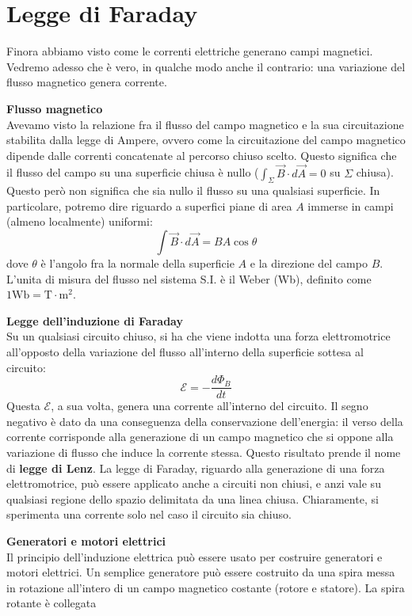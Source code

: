 \documentclass[a4paper,12pt]{article}
\begin{document}
\section{Legge di Faraday}
Finora abbiamo visto come le correnti elettriche generano campi magnetici. Vedremo adesso che è vero, in qualche
modo anche il contrario: una variazione del flusso magnetico genera corrente.
\par\smallskip
\textbf{Flusso magnetico} \\
Avevamo visto la relazione fra il flusso del campo magnetico e la sua circuitazione stabilita dalla legge di Ampere, ovvero
come la circuitazione del campo magnetico dipende dalle correnti concatenate al percorso chiuso scelto. Questo significa
che il flusso del campo su una superficie chiusa è nullo ($\int_\Sigma \vec{B} \cdot d\vec{A} = 0$ su $\Sigma$ chiusa).
Questo però non significa che sia nullo il flusso su una qualsiasi superficie. In particolare, potremo dire riguardo
a superfici piane di area $A$ immerse in campi (almeno localmente) uniformi:
$$ \int \vec{B} \cdot d\vec{A} = BA\cos{\theta} $$
dove $\theta$ è l'angolo fra la normale della superficie $A$ e la direzione del campo $B$. L'unita di misura del flusso nel sistema
S.I. è il Weber (Wb), definito come $ 1 \mathrm{Wb} = \mathrm{T} \cdot \mathrm{m}^2 $.
\par\smallskip
\textbf{Legge dell'induzione di Faraday} \\
Su un qualsiasi circuito chiuso, si ha che viene indotta una forza elettromotrice all'opposto della variazione del flusso all'interno
della superficie sottesa al circuito:
$$ \mathcal{E} = - \frac{d\Phi_B}{dt} $$
Questa $\mathcal{E}$, a sua volta, genera una corrente all'interno del circuito. Il segno negativo è dato da una conseguenza
della conservazione dell'energia: il verso della corrente corrisponde alla generazione di un campo magnetico che si oppone alla variazione
di flusso che induce la corrente stessa. Questo risultato prende il nome di \textbf{legge di Lenz}. La legge di Faraday, riguardo alla generazione
di una forza elettromotrice, può essere applicato anche a circuiti non chiusi, e anzi vale su qualsiasi regione dello spazio
delimitata da una linea chiusa. Chiaramente, si sperimenta una corrente solo nel caso il circuito sia chiuso.
\par\smallskip
\textbf{Generatori e motori elettrici} \\
Il principio dell'induzione elettrica può essere usato per costruire generatori e motori elettrici. Un semplice generatore
può essere costruito da una spira messa in rotazione all'intero di un campo magnetico costante (rotore e statore). La spira rotante è collegata
\end{document}
